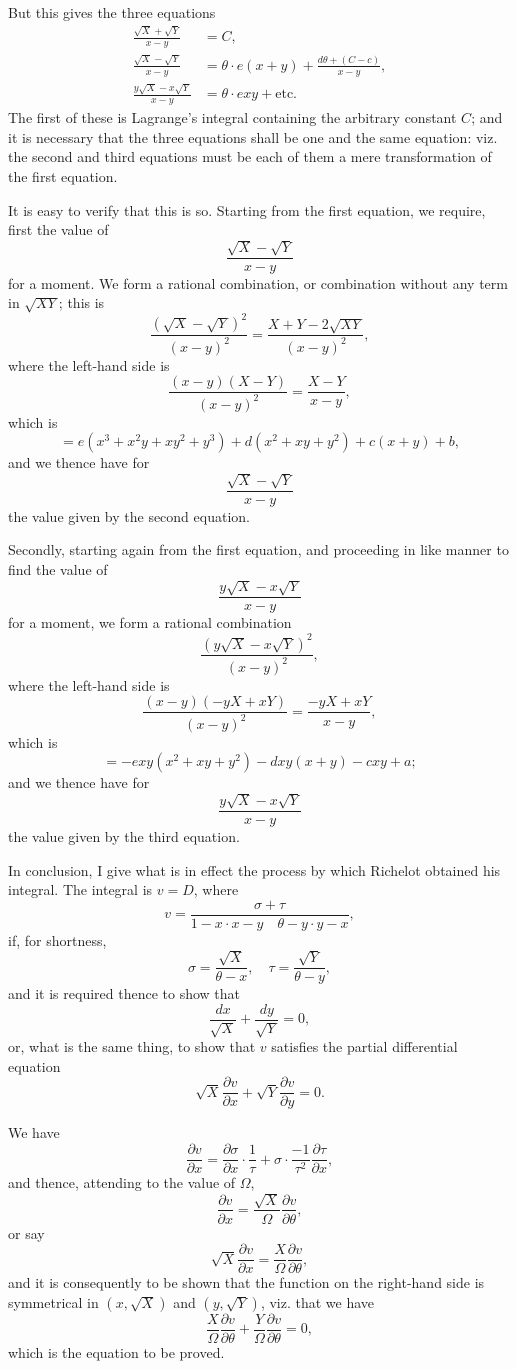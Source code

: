 \documentclass[12pt,a4paper]{article}
\theoremstyle{definition}
\begin{document}
But this gives the three equations
\begin{align*}
\frac{\sqrt{X}+\sqrt{Y}}{x-y} &= C, \\
\frac{\sqrt{X}-\sqrt{Y}}{x-y} &= \theta\cdot e(x+y) + \frac{d\theta + (C-c)}{x-y}, \\
\frac{y\sqrt{X}-x\sqrt{Y}}{x-y} &= \theta\cdot exy + \text{etc.}
\end{align*}
The first of these is Lagrange's integral containing the arbitrary constant $C$; and it is necessary that the three equations shall be one and the same equation: viz. the second and third equations must be each of them a mere transformation of the first equation.

It is easy to verify that this is so. Starting from the first equation, we require, first the value of
\[
\frac{\sqrt{X}-\sqrt{Y}}{x-y}
\]
for a moment. We form a rational combination, or combination without any term in $\sqrt{XY}$; this is
\[
\frac{(\sqrt{X}-\sqrt{Y})^2}{(x-y)^2} = \frac{X+Y-2\sqrt{XY}}{(x-y)^2},
\]
where the left-hand side is
\[
\frac{(x-y)(X-Y)}{(x-y)^2} = \frac{X-Y}{x-y},
\]
which is
\[
= e(x^3+x^2y+xy^2+y^3) + d(x^2+xy+y^2) + c(x+y) + b,
\]
and we thence have for
\[
\frac{\sqrt{X}-\sqrt{Y}}{x-y}
\]
the value given by the second equation.

Secondly, starting again from the first equation, and proceeding in like manner to find the value of
\[
\frac{y\sqrt{X}-x\sqrt{Y}}{x-y}
\]
for a moment, we form a rational combination
\[
\frac{(y\sqrt{X}-x\sqrt{Y})^2}{(x-y)^2},
\]
where the left-hand side is
\[
\frac{(x-y)(-yX+xY)}{(x-y)^2} = \frac{-yX+xY}{x-y},
\]
which is
\[
= -exy(x^2+xy+y^2) - dxy(x+y) - cxy + a;
\]
and we thence have for
\[
\frac{y\sqrt{X}-x\sqrt{Y}}{x-y}
\]
the value given by the third equation.

In conclusion, I give what is in effect the process by which Richelot obtained his integral. The integral is $v=D$, where
\[
v = \frac{\sigma + \tau}{1-x\cdot x-y\quad \theta-y\cdot y-x},
\]
if, for shortness,
\[
\sigma = \frac{\sqrt{X}}{\theta-x}, \quad \tau = \frac{\sqrt{Y}}{\theta-y},
\]
and it is required thence to show that
\[
\frac{dx}{\sqrt{X}} + \frac{dy}{\sqrt{Y}} = 0,
\]
or, what is the same thing, to show that $v$ satisfies the partial differential equation
\[
\sqrt{X}\frac{\partial v}{\partial x} + \sqrt{Y}\frac{\partial v}{\partial y} = 0.
\]

We have
\[
\frac{\partial v}{\partial x} = \frac{\partial\sigma}{\partial x}\cdot\frac{1}{\tau} + \sigma\cdot\frac{-1}{\tau^2}\frac{\partial\tau}{\partial x},
\]
and thence, attending to the value of $\Omega$,
\[
\frac{\partial v}{\partial x} = \frac{\sqrt{X}}{\Omega}\frac{\partial v}{\partial\theta},
\]
or say
\[
\sqrt{X}\frac{\partial v}{\partial x} = \frac{X}{\Omega}\frac{\partial v}{\partial\theta},
\]
and it is consequently to be shown that the function on the right-hand side is symmetrical in $(x,\sqrt{X})$ and $(y,\sqrt{Y})$, viz. that we have
\[
\frac{X}{\Omega}\frac{\partial v}{\partial\theta} + \frac{Y}{\Omega}\frac{\partial v}{\partial\theta} = 0,
\]
which is the equation to be proved.
\end{document}
